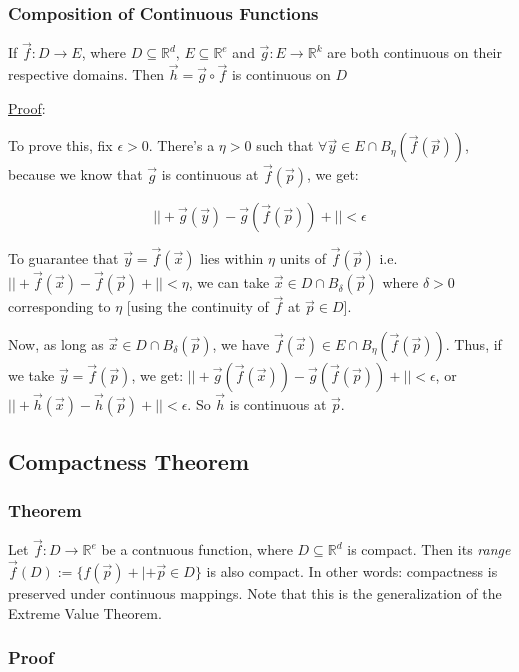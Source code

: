 \documentclass[11 pt, twoside]{article}
\begin{document}
\subsubsection{Composition of Continuous Functions}
If $\vec{f}: D \to E$, where $D \subseteq \mathbb{R}^d$, $E
\subseteq \mathbb{R}^e$ and $\vec{g}: E \to \mathbb{R}^k$ are both
continuous on their respective domains. Then $\vec{h} = \vec{g} \circ \vec{f}$
is continuous on $D$

\underline{Proof}:

To prove this, fix $\epsilon > 0$. There's a $\eta > 0$ such that
$\forall \vec{y} \in E \cap B_\eta(\vec{f}(\vec{p}))$, because we know that
$\vec{g}$ is continuous at $\vec{f}(\vec{p})$, we get:

$$||+\vec{g}(\vec{y}) - \vec{g}(\vec{f}(\vec{p}))+|| < \epsilon$$

To guarantee that $\vec{y} = \vec{f}(\vec{x})$ lies within $\eta$ units of
$\vec{f}(\vec{p})$ i.e. $||+\vec{f}(\vec{x}) - \vec{f}(\vec{p})+|| < \eta$, we
can take $\vec{x} \in D \cap B_\delta(\vec{p})$ where $\delta > 0$ corresponding
to $\eta$ [using the continuity of $\vec{f}$ at $\vec{p} \in D$].

Now, as long as $\vec{x} \in D \cap B_\delta(\vec{p})$, we have
$\vec{f}(\vec{x}) \in E \cap B_\eta(\vec{f}(\vec{p}))$. Thus, if we take
$\vec{y} = \vec{f}(\vec{p})$, we get: $||+\vec{g}(\vec{f}(\vec{x})) -
\vec{g}(\vec{f}(\vec{p}))+|| < \epsilon$, or $||+\vec{h}(\vec{x}) -
\vec{h}(\vec{p})+|| < \epsilon$. So $\vec{h}$ is continuous at $\vec{p}$.

\subsection{Compactness Theorem}

\subsubsection{Theorem}

Let $\vec{f} : D \to \mathbb{R}^e$ be a contnuous function, where $D \subseteq
\mathbb{R}^d$ is compact. Then its \textit{range} $\vec{f}(D) := \{f(\vec{p}) +|+
\vec{p} \in D\}$ is also compact. In other words: compactness is preserved under
continuous mappings. Note that this is the generalization of the Extreme Value
Theorem.

\subsubsection{Proof}
\end{document}
